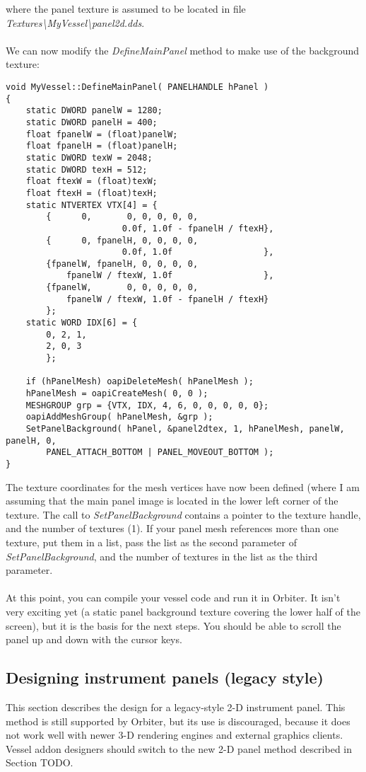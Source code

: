 \documentclass[Orbiter Developer Manual.tex]{subfiles}
\begin{document}
\noindent
where the panel texture is assumed to be located in file \textit{Textures\textbackslash MyVessel\textbackslash panel2d.dds}.\\
\\
We can now modify the \textit{DefineMainPanel} method to make use of the background texture:

\begin{lstlisting}
void MyVessel::DefineMainPanel( PANELHANDLE hPanel )
{
	static DWORD panelW = 1280;
	static DWORD panelH = 400;
	float fpanelW = (float)panelW;
	float fpanelH = (float)panelH;
	static DWORD texW = 2048;
	static DWORD texH = 512;
	float ftexW = (float)texW;
	float ftexH = (float)texH;
	static NTVERTEX VTX[4] = {
		{      0,       0, 0, 0, 0, 0,
			           0.0f, 1.0f - fpanelH / ftexH},
		{      0, fpanelH, 0, 0, 0, 0,
			           0.0f, 1.0f                  },
		{fpanelW, fpanelH, 0, 0, 0, 0,
			fpanelW / ftexW, 1.0f                  },
		{fpanelW,       0, 0, 0, 0, 0,
			fpanelW / ftexW, 1.0f - fpanelH / ftexH}
		};
	static WORD IDX[6] = {
		0, 2, 1,
		2, 0, 3
		};

	if (hPanelMesh) oapiDeleteMesh( hPanelMesh );
	hPanelMesh = oapiCreateMesh( 0, 0 );
	MESHGROUP grp = {VTX, IDX, 4, 6, 0, 0, 0, 0, 0};
	oapiAddMeshGroup( hPanelMesh, &grp );
	SetPanelBackground( hPanel, &panel2dtex, 1, hPanelMesh, panelW, panelH, 0,
		PANEL_ATTACH_BOTTOM | PANEL_MOVEOUT_BOTTOM );
}
\end{lstlisting}

\noindent
The texture coordinates for the mesh vertices have now been defined (where I am assuming that the main panel image is located in the lower left corner of the texture. The call to \textit{SetPanelBackground} contains a pointer to the texture handle, and the number of textures (1). If your panel mesh references more than one texture, put them in a list, pass the list as the second parameter of \textit{SetPanelBackground}, and the number of textures in the list as the third parameter.\\
\\
At this point, you can compile your vessel code and run it in Orbiter. It isn’t very exciting yet (a static panel background texture covering the lower half of the screen), but it is the basis for the next steps. You should be able to scroll the panel up and down with the cursor keys.


\subsection{Designing instrument panels (legacy style)}
This section describes the design for a legacy-style 2-D instrument panel. This method is still supported by Orbiter, but its use is discouraged, because it does not work well with newer 3-D rendering engines and external graphics clients. Vessel addon designers should switch to the new 2-D panel method described in Section TODO.
\end{document}
